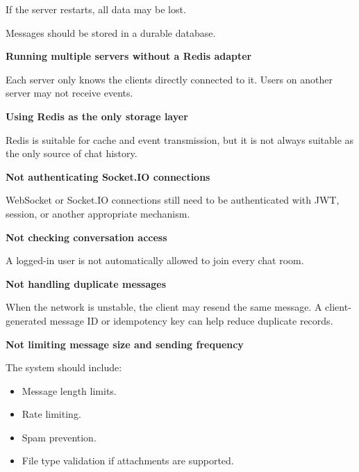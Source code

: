 If the server restarts, all data may be lost.

\begin{Shaded}
\begin{Highlighting}[]
\end{Highlighting}
\end{Shaded}

Messages should be stored in a durable database.

\vspace{0.5em}\noindent\textbf{Running multiple servers without a Redis
adapter}\par

Each server only knows the clients directly connected to it. Users on
another server may not receive events.

\vspace{0.5em}\noindent\textbf{Using Redis as the only storage
layer}\par

Redis is suitable for cache and event transmission, but it is not always
suitable as the only source of chat history.

\vspace{0.5em}\noindent\textbf{Not authenticating Socket.IO
connections}\par

WebSocket or Socket.IO connections still need to be authenticated with
JWT, session, or another appropriate mechanism.

\vspace{0.5em}\noindent\textbf{Not checking conversation
access}\par

A logged-in user is not automatically allowed to join every chat room.

\vspace{0.5em}\noindent\textbf{Not handling duplicate
messages}\par

When the network is unstable, the client may resend the same message. A
client-generated message ID or idempotency key can help reduce duplicate
records.

\vspace{0.5em}\noindent\textbf{Not limiting message size and sending
frequency}\par

The system should include:

\begin{itemize}
\tightlist
\item
  Message length limits.
\item
  Rate limiting.
\item
  Spam prevention.
\item
  File type validation if attachments are supported.
\end{itemize}

